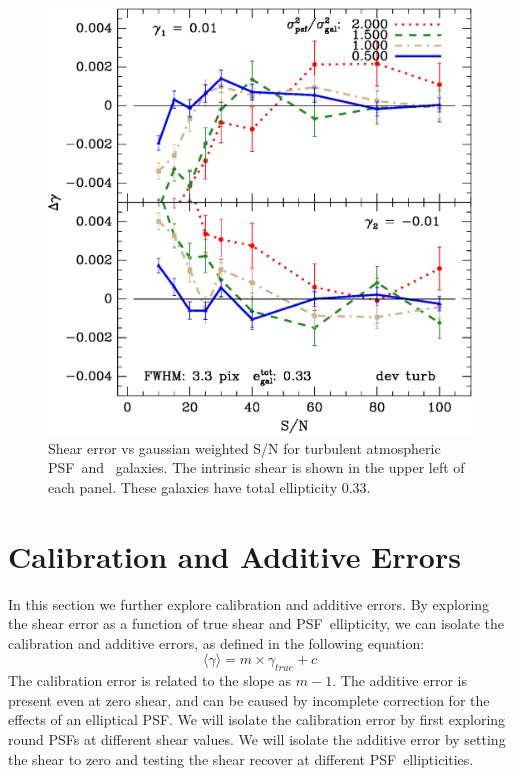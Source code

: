 \documentclass[10pt,preprint]{aastex}
\newcommand{\psf}{PSF}
\begin{document}
\begin{figure}[t] \centering \centering
\includegraphics[scale=0.7]{figures/gmix-fit-dt03r05-yr-0.005-0.005-diff.eps}

 \caption{Shear error vs gaussian weighted S/N for turbulent atmospheric \psf\
 and \devauc\ galaxies. The intrinsic shear is shown in the upper left of each
 panel.  These galaxies have total ellipticity 0.33.  \label{fig:dt03r03r04}}

\end{figure}


\section{Calibration and Additive Errors}

In this section we further explore calibration and additive errors.  By
exploring the shear error as a function of true shear and \psf\ ellipticity, we
can isolate the calibration and additive errors, as defined in the following
equation:
\begin{equation}
\langle \gamma \rangle = m\times \gamma_{true} + c
\end{equation}
The calibration error is related to the slope as $m-1$.  The additive error is
present even at zero shear, and can be caused by incomplete correction for the
effects of an elliptical \psf.  We will isolate the calibration error by first
exploring round \psf s at different shear values.  We will isolate the additive
error by setting the shear to zero and testing the shear recover at different
\psf\ ellipticities.
\end{document}
